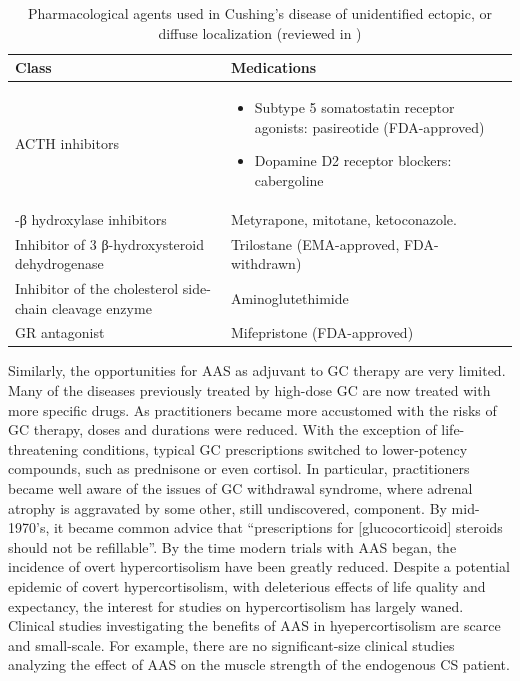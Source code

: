 \documentclass[12pt,english]{report}\usepackage[]{graphicx}\usepackage[]{color}
\providecommand{\tabularnewline}{\\}
\begin{document}
\begin{table}
\begin{tabular}{|>{\centering}m{}|>{\raggedright}p{}|}
\hline 
Class &
Medications\tabularnewline
\hline 
\hline 
ACTH inhibitors &
\begin{itemize}
\item Subtype 5 somatostatin receptor agonists: pasireotide (FDA-approved)\citep{colao201212-month}
\item Dopamine D2 receptor blockers: cabergoline\end{itemize}
\tabularnewline
\hline 
11-β hydroxylase inhibitors &
Metyrapone, mitotane, ketoconazole.\tabularnewline
\hline 
Inhibitor of 3 β-hydroxysteroid dehydrogenase &
Trilostane (EMA-approved, FDA-withdrawn)\citep{komanicky1978treatment}\tabularnewline
\hline 
Inhibitor of the cholesterol side-chain cleavage enzyme &
Aminoglutethimide\tabularnewline
\hline 
GR antagonist &
Mifepristone (FDA-approved)\citep{nieman1985successful}\tabularnewline
\hline 
\end{tabular}

\protect\caption{\label{tab:Pharmacological-unoperable-Cushing-disease}Pharmacological
agents used in Cushing's disease of unidentified ectopic, or diffuse
localization (reviewed in \citep{newell-price2006cushings,molitch2014current})}
\end{table}


Similarly, the opportunities for AAS as adjuvant to GC therapy are
very limited. Many of the diseases previously treated by high-dose
GC are now treated with more specific drugs. As practitioners became
more accustomed with the risks of GC therapy, doses and durations
were reduced. With the exception of life-threatening conditions, typical
GC prescriptions switched to lower-potency compounds, such as prednisone
or even cortisol. In particular, practitioners became well aware of
the issues of GC withdrawal syndrome, where adrenal atrophy is aggravated
by some other, still undiscovered, component\citep{amatruda1960study}.
By mid-1970's, it became common advice that ``prescriptions for {[}glucocorticoid{]}
steroids should not be refillable''\citep{bergner1976rational}.
By the time modern trials with AAS began, the incidence of overt hypercortisolism
have been greatly reduced. Despite a potential epidemic of covert
hypercortisolism, with deleterious effects of life quality and expectancy,
the interest for studies on hypercortisolism has largely waned. Clinical
studies investigating the benefits of AAS in hyepercortisolism are
scarce and small-scale. For example, there are no significant-size
clinical studies analyzing the effect of AAS on the muscle strength
of the endogenous CS patient.
\end{document}
